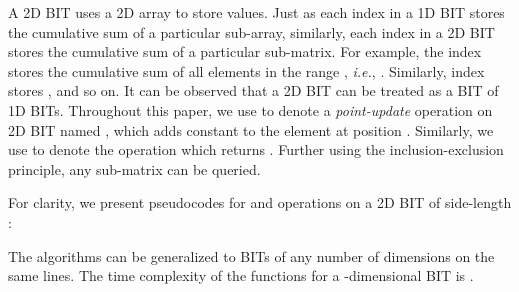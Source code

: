 \documentclass[a4paper]{article}
\begin{document}
\vspace {3 mm}
\noindent
{}
\begin{algorithmic}[1]

        \State 
        \State 
        \While {}
            \State 
            \State 
        \EndWhile
        \State \Return 
\EndFunction
\end{algorithmic}

\vspace{3 mm}
A 2D BIT uses a 2D array to store values. Just as each index in a 1D BIT stores the cumulative sum of a particular sub-array, similarly, each index in a 2D BIT stores the cumulative sum of a particular sub-matrix. For example, the index  stores the cumulative sum of all elements in the range , \textit{i.e.}, . Similarly, index  stores , and so on. It can be observed that a 2D BIT can be treated as a BIT of 1D BITs. Throughout this paper, we use  to denote a \textit{point-update} operation on 2D BIT named , which adds constant  to the element at position . Similarly, we use  to denote the operation which returns . Further using the inclusion-exclusion principle, any sub-matrix can be queried.

\vspace{2 mm}
For clarity, we present pseudocodes for  and  operations on a 2D BIT of side-length :

\vspace {3 mm}
\noindent
{}
\begin{algorithmic}[1]

        \State 
        \While {}
            \State 
            \While{}
                \State 
                \State 
            \EndWhile
            \State 
        \EndWhile
\EndFunction
\end{algorithmic}

\vspace {3 mm}
\noindent
{}
\begin{algorithmic}[1]

        \State 
        \State 
        \While {}
            \State 
            \While{}
                \State 
                \State 
            \EndWhile
            \State 
        \EndWhile
        \State \Return 
\EndFunction
\end{algorithmic}

\vspace{3 mm}
The algorithms can be generalized to BITs of any number of dimensions on the same lines. The time complexity of the functions for a -dimensional BIT is .
\end{document}
